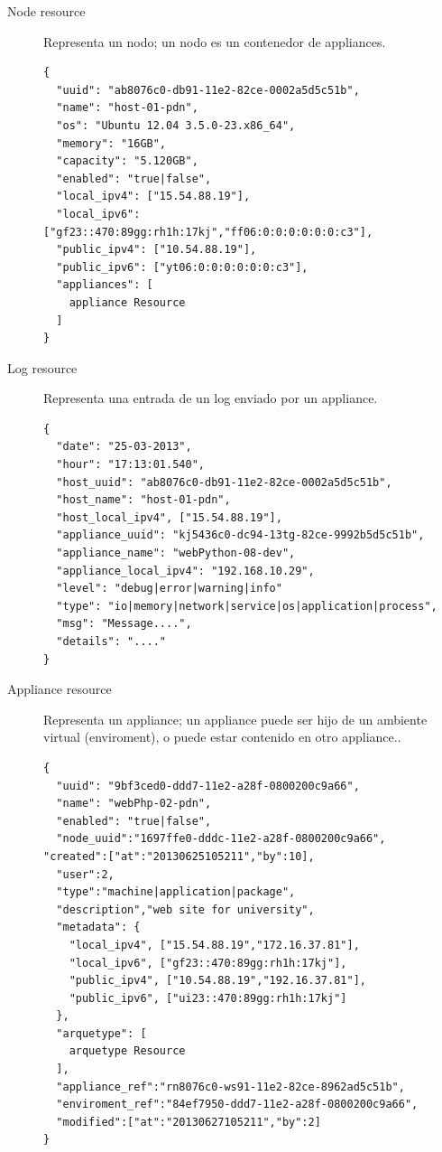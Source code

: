 \begin{description}
\item [Node resource] Representa un nodo; un nodo es un contenedor de appliances.

\medskip
\begin{lstlisting}
{
  "uuid": "ab8076c0-db91-11e2-82ce-0002a5d5c51b",
  "name": "host-01-pdn",
  "os": "Ubuntu 12.04 3.5.0-23.x86_64",
  "memory": "16GB",
  "capacity": "5.120GB",
  "enabled": "true|false",
  "local_ipv4": ["15.54.88.19"],
  "local_ipv6": ["gf23::470:89gg:rh1h:17kj","ff06:0:0:0:0:0:0:c3"],
  "public_ipv4": ["10.54.88.19"],
  "public_ipv6": ["yt06:0:0:0:0:0:0:c3"],  
  "appliances": [
    appliance Resource
  ]
}
\end{lstlisting}

\item [Log resource] Representa una entrada de un log enviado por un appliance. 

\medskip
\begin{lstlisting}
{
  "date": "25-03-2013",
  "hour": "17:13:01.540",
  "host_uuid": "ab8076c0-db91-11e2-82ce-0002a5d5c51b",
  "host_name": "host-01-pdn",
  "host_local_ipv4", ["15.54.88.19"],
  "appliance_uuid": "kj5436c0-dc94-13tg-82ce-9992b5d5c51b",
  "appliance_name": "webPython-08-dev",
  "appliance_local_ipv4": "192.168.10.29",
  "level": "debug|error|warning|info"
  "type": "io|memory|network|service|os|application|process",
  "msg": "Message....",
  "details": "...."
}
\end{lstlisting}

\item [Appliance resource] Representa un appliance; un appliance puede ser hijo de un ambiente virtual (enviroment), o puede estar contenido en otro appliance..

\medskip
\begin{lstlisting}
{
  "uuid": "9bf3ced0-ddd7-11e2-a28f-0800200c9a66",
  "name": "webPhp-02-pdn",
  "enabled": "true|false",
  "node_uuid":"1697ffe0-dddc-11e2-a28f-0800200c9a66",  "created":["at":"20130625105211","by":10],
  "user":2,
  "type":"machine|application|package",
  "description","web site for university",  
  "metadata": {
	"local_ipv4", ["15.54.88.19","172.16.37.81"],
	"local_ipv6", ["gf23::470:89gg:rh1h:17kj"], 
	"public_ipv4", ["10.54.88.19","192.16.37.81"],
	"public_ipv6", ["ui23::470:89gg:rh1h:17kj"]
  },
  "arquetype": [
    arquetype Resource
  ],
  "appliance_ref":"rn8076c0-ws91-11e2-82ce-8962ad5c51b",
  "enviroment_ref":"84ef7950-ddd7-11e2-a28f-0800200c9a66",
  "modified":["at":"20130627105211","by":2]
}
\end{lstlisting}


\end{description}
